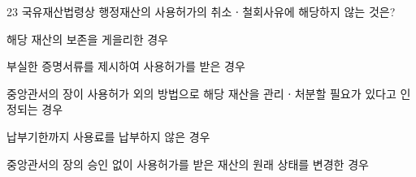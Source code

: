 \begin{question}{23}
국유재산법령상 행정재산의 사용허가의 취소ㆍ철회사유에 해당하지 않는 것은?
\begin{choices}
  \item 해당 재산의 보존을 게을리한 경우
  \item 부실한 증명서류를 제시하여 사용허가를 받은 경우
  \item 중앙관서의 장이 사용허가 외의 방법으로 해당 재산을 관리ㆍ처분할 필요가 있다고 인정되는 경우
  \item 납부기한까지 사용료를 납부하지 않은 경우
  \item 중앙관서의 장의 승인 없이 사용허가를 받은 재산의 원래 상태를 변경한 경우
\end{choices}
\end{question}
